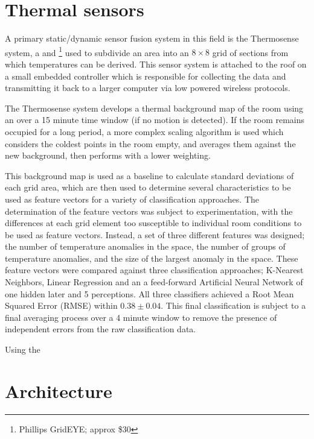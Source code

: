 \documentclass[../thesis/thesis.tex]{subfiles}
\begin{document}
\section{Thermal sensors}
\label{sec:litreview:thermalsensors}

A primary static/dynamic sensor fusion system in this field is the Thermosense system, \cite{beltran2013thermosense} a \pir and \iar\footnote{Phillips GridEYE; approx \$30} used to subdivide an area into an $8\times8$ grid of sections from which temperatures can be derived. This sensor system is attached to the roof on a small embedded controller which is responsible for collecting the data and transmitting it back to a larger computer via low powered wireless protocols.

The Thermosense system develops a thermal background map of the room using an \emwa over a 15 minute time window (if no motion is detected). If the room remains occupied for a long period, a more complex scaling algorithm is used which considers the coldest points in the room empty, and averages them against the new background, then performs \emwa with a lower weighting.

This background map is used as a baseline to calculate standard deviations of each grid area, which are then used to determine several characteristics to be used as feature vectors for a variety of classification approaches. The determination of the feature vectors was subject to experimentation, with the differences at each grid element too susceptible to individual room conditions to be used as feature vectors. Instead, a set of three different features was designed; the number of temperature anomalies in the space, the number of groups of temperature anomalies, and the size of the largest anomaly in the space. These feature vectors were compared against three classification approaches; K-Nearest Neighbors, Linear Regression and an a feed-forward Artificial Neural Network of one hidden later and 5 perceptions. All three classifiers achieved a Root Mean Squared Error (RMSE) within $0.38\pm0.04$. This final classification is subject to a final averaging process over a 4 minute window to remove the presence of independent errors from the raw classification data.

Using the \mlx

\section{Architecture}
\label{sec:litreview:architecture}


\end{document}
